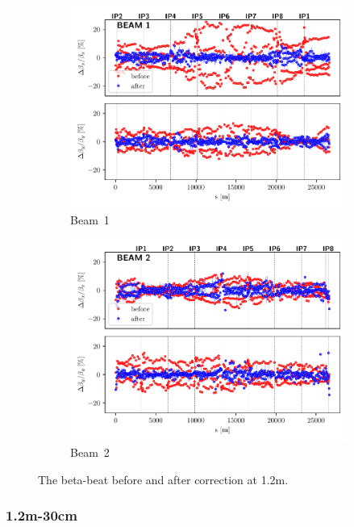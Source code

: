 \documentclass{cernatsnote}
\begin{document}
\begin{figure}[ht]
\begin{subfigure}{.5\textwidth}
  \centering
  \includegraphics[width=.98\linewidth]{2023/2m/beta_plot_120cm_BEAM_1.pdf}  
  \caption{Beam~1}
\end{subfigure}
\begin{subfigure}{.5\textwidth}
  \centering
  \includegraphics[width=.98\linewidth]{2023/2m/beta_plot_120cm_BEAM_2.pdf}  
  \caption{Beam~2}
\end{subfigure}
\caption{The beta-beat before and after correction at 1.2m.}
\label{fig:2m_before_after_correction}
\end{figure}


\subsubsection{1.2m-30cm}
\end{document}
